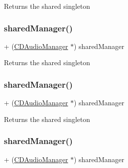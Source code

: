 Returns the shared singleton \mbox{\label{interfaceCDAudioManager_a757b69bd4a902166b3ffa81ea85ba6e8}} 
\subsubsection{\texorpdfstring{shared\+Manager()}{sharedManager()}\hspace{0.1cm}{\footnotesize\ttfamily [2/4]}}
{\footnotesize\ttfamily + (\hyperlink{interfaceCDAudioManager}{C\+D\+Audio\+Manager} $\ast$) shared\+Manager \begin{DoxyParamCaption}{ }\end{DoxyParamCaption}}

Returns the shared singleton \mbox{\label{interfaceCDAudioManager_a757b69bd4a902166b3ffa81ea85ba6e8}} 
\subsubsection{\texorpdfstring{shared\+Manager()}{sharedManager()}\hspace{0.1cm}{\footnotesize\ttfamily [3/4]}}
{\footnotesize\ttfamily + (\hyperlink{interfaceCDAudioManager}{C\+D\+Audio\+Manager} $\ast$) shared\+Manager \begin{DoxyParamCaption}{ }\end{DoxyParamCaption}}

Returns the shared singleton \mbox{\label{interfaceCDAudioManager_a757b69bd4a902166b3ffa81ea85ba6e8}} 
\subsubsection{\texorpdfstring{shared\+Manager()}{sharedManager()}\hspace{0.1cm}{\footnotesize\ttfamily [4/4]}}
{\footnotesize\ttfamily + (\hyperlink{interfaceCDAudioManager}{C\+D\+Audio\+Manager} $\ast$) shared\+Manager \begin{DoxyParamCaption}{ }\end{DoxyParamCaption}}

